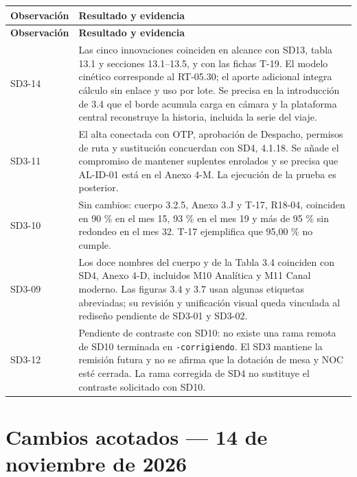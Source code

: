 \documentclass[11pt,letterpaper]{article}
\begin{document}
\begin{longtable}{@{}P{0.17\textwidth}P{\tabcolsep\relax}@{}}
\hline
\textbf{Observación} & \textbf{Resultado y evidencia} \\
\hline
\endfirsthead
\hline
\textbf{Observación} & \textbf{Resultado y evidencia} \\
\hline
\endhead
\hline
\endfoot
SD3-14 & Las cinco innovaciones coinciden en alcance con SD13, tabla 13.1 y secciones 13.1--13.5, y con las fichas T-19. El modelo cinético corresponde al RT-05.30; el aporte adicional integra cálculo sin enlace y uso por lote. Se precisa en la introducción de 3.4 que el borde acumula carga en cámara y la plataforma central reconstruye la historia, incluida la serie del viaje. \\
SD3-11 & El alta conectada con OTP, aprobación de Despacho, permisos de ruta y sustitución concuerdan con SD4, 4.1.18. Se añade el compromiso de mantener suplentes enrolados y se precisa que AL-ID-01 está en el Anexo 4-M. La ejecución de la prueba es posterior. \\
SD3-10 & Sin cambios: cuerpo 3.2.5, Anexo 3.J y T-17, R18-04, coinciden en 90 \% en el mes 15, 93 \% en el mes 19 y más de 95 \% sin redondeo en el mes 32. T-17 ejemplifica que 95,00 \% no cumple. \\
SD3-09 & Los doce nombres del cuerpo y de la Tabla 3.4 coinciden con SD4, Anexo 4-D, incluidos M10 Analítica y M11 Canal moderno. Las figuras 3.4 y 3.7 usan algunas etiquetas abreviadas; su revisión y unificación visual queda vinculada al rediseño pendiente de SD3-01 y SD3-02. \\
SD3-12 & Pendiente de contraste con SD10: no existe una rama remota de SD10 terminada en \texttt{-corrigiendo}. El SD3 mantiene la remisión futura y no se afirma que la dotación de mesa y NOC esté cerrada. La rama corregida de SD4 no sustituye el contraste solicitado con SD10. \\
\end{longtable}

\section*{Cambios acotados — 14 de noviembre de 2026}
\end{document}
